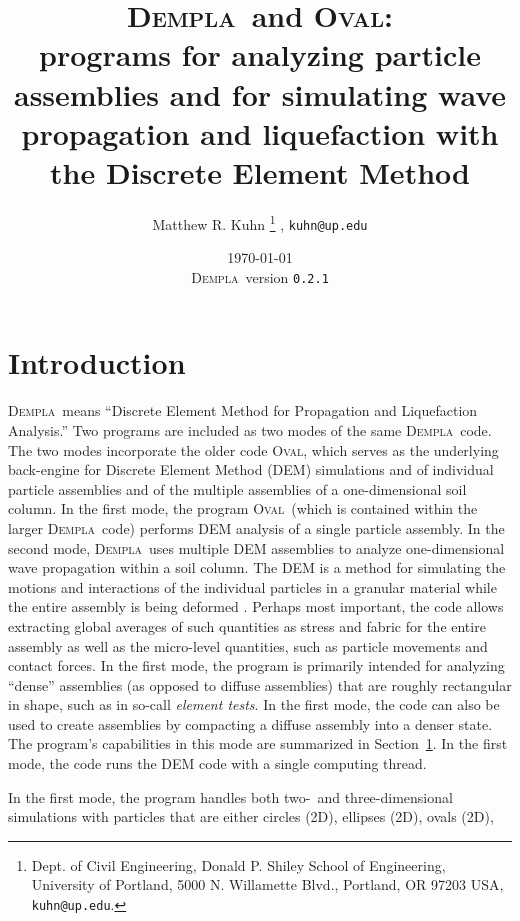 \documentclass[letterpaper,11pt]{article}
\newcommand{\Oval}{\textsc{Oval}}
\newcommand{\Dempla}{\textsc{Dempla}}
\newcommand{\VersionB}{\texttt{0.2.1}}
\begin{document}
%
\title{\Dempla\ and \Oval:\\programs for analyzing
particle assemblies
and for simulating wave propagation and liquefaction
with the Discrete Element Method}
%
\author{
Matthew R. Kuhn%
\thanks{Dept. of Civil Engineering, Donald P. Shiley School of Engineering,
University of Portland,
5000 N. Willamette Blvd., Portland, OR 97203 USA,
\texttt{kuhn@up.edu}.}%
, \texttt{kuhn@up.edu}%
}
\date{\today\\ \Dempla\ version \VersionB}
%
\maketitle
%
\section{Introduction}
\Dempla\ means ``Discrete Element Method for Propagation
and Liquefaction Analysis.''
Two programs are included as two modes of the same \Dempla\ code.
The two modes incorporate the older code \Oval,
which serves as the underlying back-engine for
Discrete Element Method (DEM) simulations and
of individual particle assemblies and of the
multiple assemblies of a one-dimensional
soil column.
In the first mode,
the program \Oval\ 
(which is contained within the larger \Dempla\ code)
performs DEM analysis of a single particle assembly.
In the second mode,
\Dempla\ uses multiple DEM assemblies to analyze
one-dimensional wave propagation within a soil column.
The DEM is a method for
simulating the motions and interactions of the individual particles
in a granular material while the entire assembly is 
being deformed \cite{Cundall:1979a}.
Perhaps most important, the code allows extracting global averages
of such quantities as stress and fabric for the entire assembly
as well as the micro-level quantities, such as particle movements and contact
forces.
In the first mode,
the program is primarily intended for analyzing ``dense''
assemblies (as opposed to diffuse assemblies) 
that are roughly rectangular in shape, such as in so-call \emph{element tests}.
In the first mode, the code
can also be used to create assemblies by
compacting a diffuse assembly into a denser state.
The program's capabilities in this mode are summarized in
Section~\ref{}.
In the first mode, the code runs the DEM code with a single
computing thread.
\par
In the first mode,
the program handles both two-~and three-dimensional simulations
with particles that are either circles (2D), ellipses (2D), ovals (2D),
\end{document}

